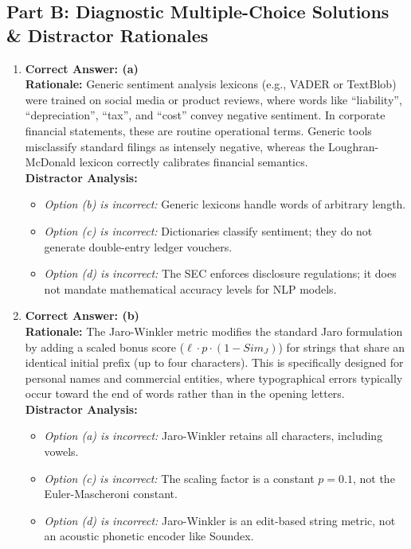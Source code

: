 \subsection*{Part B: Diagnostic Multiple-Choice Solutions \& Distractor Rationales}

\begin{enumerate}[label=\textbf{MCQ 11.\arabic*}]
    \item \textbf{Correct Answer: (a)}\\
    \textbf{Rationale:} Generic sentiment analysis lexicons (e.g., VADER or TextBlob) were trained on social media or product reviews, where words like ``liability'', ``depreciation'', ``tax'', and ``cost'' convey negative sentiment. In corporate financial statements, these are routine operational terms. Generic tools misclassify standard filings as intensely negative, whereas the Loughran-McDonald lexicon correctly calibrates financial semantics.\\
    \textbf{Distractor Analysis:}
    \begin{itemize}
        \item \textit{Option (b) is incorrect:} Generic lexicons handle words of arbitrary length.
        \item \textit{Option (c) is incorrect:} Dictionaries classify sentiment; they do not generate double-entry ledger vouchers.
        \item \textit{Option (d) is incorrect:} The SEC enforces disclosure regulations; it does not mandate mathematical accuracy levels for NLP models.
    \end{itemize}

    \item \textbf{Correct Answer: (b)}\\
    \textbf{Rationale:} The Jaro-Winkler metric modifies the standard Jaro formulation by adding a scaled bonus score ($\ell \cdot p \cdot (1 - Sim_J)$) for strings that share an identical initial prefix (up to four characters). This is specifically designed for personal names and commercial entities, where typographical errors typically occur toward the end of words rather than in the opening letters.\\
    \textbf{Distractor Analysis:}
    \begin{itemize}
        \item \textit{Option (a) is incorrect:} Jaro-Winkler retains all characters, including vowels.
        \item \textit{Option (c) is incorrect:} The scaling factor is a constant $p = 0.1$, not the Euler-Mascheroni constant.
        \item \textit{Option (d) is incorrect:} Jaro-Winkler is an edit-based string metric, not an acoustic phonetic encoder like Soundex.
    \end{itemize}
\end{enumerate}

